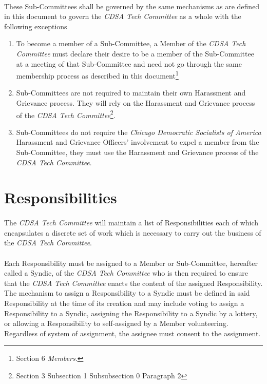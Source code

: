 \documentclass[12pt,letter,twocolumn,oneside,draft]{article}
\newcommand{\cname}{\emph{CDSA Tech Committee}}
\newcommand{\cdsa}{\emph{Chicago Democratic Socialists of America}}
\begin{document}
\paragraph{}
These Sub-Committees shall be governed by the same mechanisms as are defined in
this document to govern the \cname{} as a whole with the following exceptions
\begin{enumerate}
    \item{To become a member of a Sub-Committee, a Member of the \cname{} must
        declare their desire to be a member of the Sub-Committee at a meeting
        of that Sub-Committee and need not go through the same membership
        process as described in this document\footnote{Section 6
        \emph{Members}.}}
    \item{Sub-Committees are not required to maintain their own Harassment and
        Grievance process. They will rely on the Harassment and Grievance
        process of the \cname{}\footnote{Section 3 Subsection 1 Subsubsection 0
        Paragraph 2}.}
    \item{Sub-Committees do not require the \cdsa{} Harassment and Grievance
        Officers' involvement to expel a member from the Sub-Committee, they
        must use the Harassment and Grievance process of the \cname{}.}
\end{enumerate}


\section{Responsibilities}

\paragraph{}
The \cname{} will maintain a list of Responsibilities each of which
encapsulates a discrete set of work which is necessary to carry out the
business of the \cname{}.

\paragraph{}
Each Responsibility must be assigned to a Member or Sub-Committee, hereafter
called a Syndic, of the \cname{} who is then required to ensure that the
\cname{} enacts the content of the assigned Responsibility. The mechanism to
assign a Responsibility to a Syndic must be defined in said Responsibility at
the time of its creation and may include voting to assign a Responsibility to a
Syndic, assigning the Responsibility to a Syndic by a lottery, or allowing a
Responsibility to self-assigned by a Member volunteering. Regardless of system
of assignment, the assignee must consent to the assignment.
\end{document}
